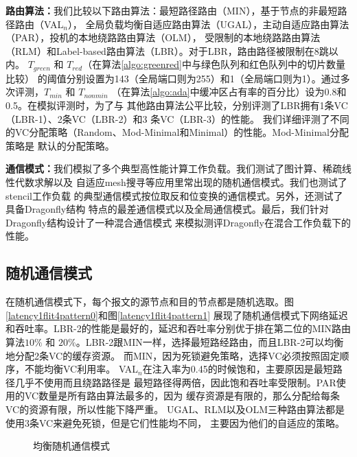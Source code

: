 \textbf{路由算法：}我们比较以下路由算法：最短路径路由（MIN），基于节点的非最短路径路由（VAL$_n$），
全局负载均衡自适应路由算法（UGAL），主动自适应路由算法（PAR），投机的本地绕路路由算法（OLM），
受限制的本地绕路路由算法（RLM）和Label-based路由算法（LBR）。对于LBR，路由路径被限制在8跳以内。
$T_{green}$ 和 $T_{red}$（在算法\ref{algo:greenred}中与绿色队列和红色队列中的切片数量比较）
的阈值分别设置为143（全局端口则为255）和1（全局端口则为1）。通过多次评测，$T_{min}$ 和 $T_{nonmin}$
（在算法\ref{algo:ada}中缓冲区占有率的百分比）设为0.8和0.5。在模拟评测时，为了与
其他路由算法公平比较，分别评测了LBR拥有1条VC（LBR-1）、2条VC（LBR-2）和3 条VC（LBR-3）的性能。
我们详细评测了不同的VC分配策略（Random、Mod-Minimal和Minimal）的性能。Mod-Minimal分配策略是
默认的分配策略。

\textbf{通信模式：}我们模拟了多个典型高性能计算工作负载。我们测试了图计算、稀疏线性代数求解以及
自适应mesh搜寻等应用里常出现的随机通信模式。我们也测试了stencil工作负载
的典型通信模式按位取反和位变换的通信模式。另外，还测试了具备Dragonfly结构
特点的最差通信模式以及全局通信模式。最后，我们针对Dragonfly结构设计了一种混合通信模式
来模拟测评Dragonfly在混合工作负载下的性能。


\subsection{随机通信模式}

在随机通信模式下，每个报文的源节点和目的节点都是随机选取。图\ref{latency1flit4pattern0}和图\ref{latency1flit4pattern1}
展现了随机通信模式下网络延迟和吞吐率。LBR-2的性能是最好的，延迟和吞吐率分别优于排在第二位的MIN路由算法$10\%$ 和
$20\%$。LBR-2跟MIN一样，选择最短路经路由，而且LBR-2可以均衡地分配2条VC的缓存资源。
而MIN，因为死锁避免策略，选择VC必须按照固定顺序，不能均衡VC利用率。
VAL$_n$在注入率为0.45的时候饱和，主要原因是最短路径几乎不使用而且绕路路径是
最短路径得两倍，因此饱和吞吐率受限制。PAR使用的VC数量是所有路由算法最多的，因为
缓存资源是有限的，那么分配给每条VC的资源有限，所以性能下降严重。
UGAL、RLM以及OLM三种路由算法都是使用3条VC来避免死锁，但是它们性能均不同，
主要因为他们的自适应的策略。


\begin{figure*}[htbp]
  \centering
  \begin{minipage}[t]{\textwidth}
  \centering
  \caption{均衡随机通信模式}
  \label{fig:random}
  \end{minipage}
  \end{figure*}

